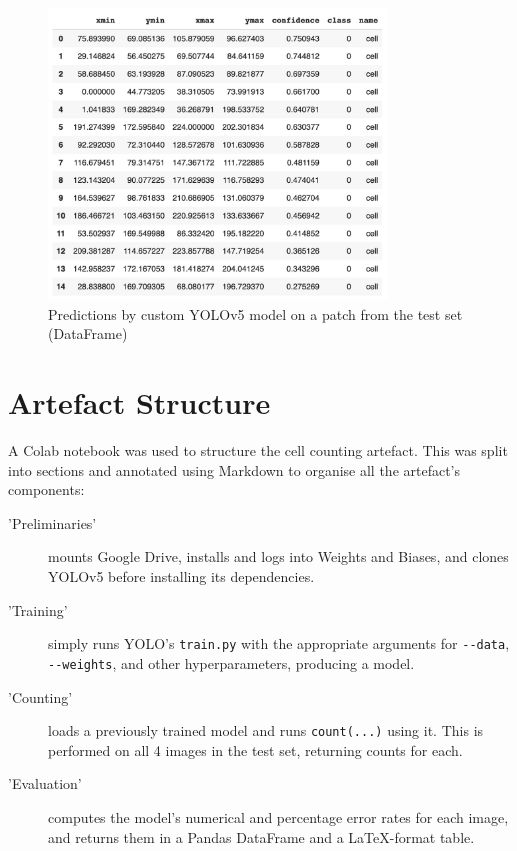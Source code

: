 \begin{figure}[h!]
	\centering
	\includegraphics[width=0.8\textwidth]{images/04Implementation/dataframe.png}
	\caption{Predictions by custom YOLOv5 model on a patch from the test set (DataFrame)}
    \label{dataframe}
\end{figure}

\section{Artefact Structure}
A Colab notebook was used to structure the cell counting artefact. This was split into sections and annotated using Markdown to organise all the artefact's components:

\begin{description}
    \item['Preliminaries'] mounts Google Drive, installs and logs into Weights and Biases, and clones YOLOv5 before installing its dependencies.
    
    \item['Training'] simply runs YOLO's \verb|train.py| with the appropriate arguments for \verb|--data|, \verb|--weights|, and other hyperparameters, producing a model.
    
    \item['Counting'] loads a previously trained model and runs \verb`count(...)` using it. This is performed on all 4 images in the test set, returning counts for each.
    
    \item['Evaluation'] computes the model's numerical and percentage error rates for each image, and returns them in a Pandas DataFrame and a LaTeX-format table.
\end{description}